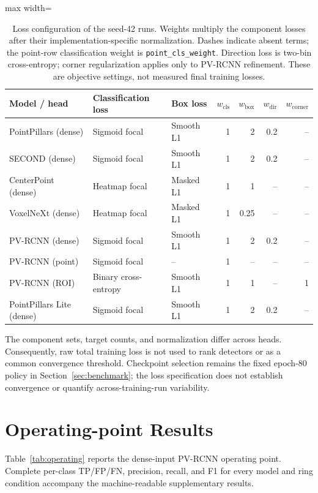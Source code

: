 \documentclass[10pt,twocolumn]{article}
\begin{document}
\begin{table}[!tbp]
\centering\small
\caption{Loss configuration of the seed-42 runs. Weights multiply the component losses after their implementation-specific normalization. Dashes indicate absent terms; the point-row classification weight is \texttt{point\_cls\_weight}. Direction loss is two-bin cross-entropy; corner regularization applies only to PV-RCNN refinement. These are objective settings, not measured final training losses.}
\label{tab:loss-config}
\begin{adjustbox}{max width=\textwidth}\begin{tabular}{lllrrrr}
\toprule
Model / head & Classification loss & Box loss & $w_{\mathrm{cls}}$ & $w_{\mathrm{box}}$ & $w_{\mathrm{dir}}$ & $w_{\mathrm{corner}}$\\
\midrule
PointPillars (dense) & Sigmoid focal & Smooth L1 & 1 & 2 & 0.2 & --\\
SECOND (dense) & Sigmoid focal & Smooth L1 & 1 & 2 & 0.2 & --\\
CenterPoint (dense) & Heatmap focal & Masked L1 & 1 & 1 & -- & --\\
VoxelNeXt (dense) & Heatmap focal & Masked L1 & 1 & 0.25 & -- & --\\
PV-RCNN (dense) & Sigmoid focal & Smooth L1 & 1 & 2 & 0.2 & --\\
PV-RCNN (point) & Sigmoid focal & -- & 1 & -- & -- & --\\
PV-RCNN (ROI) & Binary cross-entropy & Smooth L1 & 1 & 1 & -- & 1\\
PointPillars Lite (dense) & Sigmoid focal & Smooth L1 & 1 & 2 & 0.2 & --\\
\bottomrule
\end{tabular}\end{adjustbox}
\end{table}

The component sets, target counts, and normalization differ across heads. Consequently, raw total training loss is not used to rank detectors or as a common convergence threshold. Checkpoint selection remains the fixed epoch-80 policy in Section~\ref{sec:benchmark}; the loss specification does not establish convergence or quantify across-training-run variability.

\section{Operating-point Results}
\label{app:operating}
Table~\ref{tab:operating} reports the dense-input PV-RCNN operating point. Complete per-class TP/FP/FN, precision, recall, and F1 for every model and ring condition accompany the machine-readable supplementary results.
\end{document}
